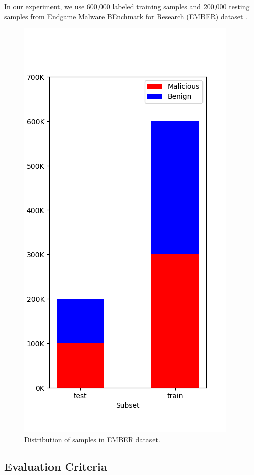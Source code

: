 \documentclass[runningheads]{llncs}
\begin{document}
In our experiment, we use 600,000 labeled training samples and 200,000 testing samples from Endgame Malware BEnchmark for Research (EMBER) dataset \cite{anderson2018ember}.

\begin{figure}[H]
\centering
\includegraphics[scale=0.4]{dataset.png}
\caption{Distribution of samples in EMBER dataset.}
\label{fig:ember}
\end{figure}

\subsection{Evaluation Criteria}
\end{document}

